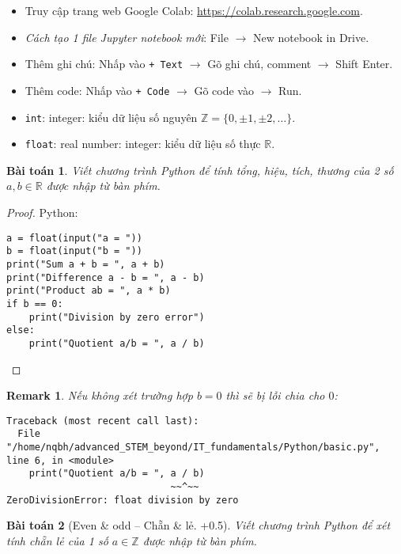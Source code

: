 \documentclass{article}
\newtheorem{baitoan}{Bài toán}
\newtheorem{remark}{Remark}
\begin{document}
\begin{itemize}
	\item Truy cập trang web Google Colab: \url{https://colab.research.google.com}.
	\item {\it Cách tạo 1 file Jupyter notebook mới}: File $\to$ New notebook in Drive.
	\item Thêm ghi chú: Nhấp vào {\tt+ Text} $\to$ Gõ ghi chú, comment $\to$ Shift Enter.
	\item Thêm code: Nhấp vào {\tt+ Code} $\to$ Gõ code vào $\to$ Run.
\end{itemize}

\begin{itemize}
	\item {\tt int}: integer: kiểu dữ liệu số nguyên $\mathbb{Z} = \{0,\pm1,\pm2,\ldots\}$.
	\item {\tt float}: real number: integer: kiểu dữ liệu số thực $\mathbb{R}$.
\end{itemize}

\begin{baitoan}
	Viết chương trình Python để tính tổng, hiệu, tích, thương của 2 số $a,b\in\mathbb{R}$ được nhập từ bàn phím.
\end{baitoan}

\begin{proof}
	Python:
	\begin{verbatim}
a = float(input("a = "))
b = float(input("b = "))
print("Sum a + b = ", a + b)
print("Difference a - b = ", a - b)
print("Product ab = ", a * b)
if b == 0:
    print("Division by zero error")
else:
    print("Quotient a/b = ", a / b)
	\end{verbatim}
\end{proof}

\begin{remark}
	Nếu không xét trường hợp $b = 0$ thì sẽ bị lỗi chia cho $0$:
	\begin{verbatim}
Traceback (most recent call last):
  File "/home/nqbh/advanced_STEM_beyond/IT_fundamentals/Python/basic.py", line 6, in <module>
    print("Quotient a/b = ", a / b)
                             ~~^~~
ZeroDivisionError: float division by zero
	\end{verbatim}
\end{remark}

\begin{baitoan}[Even \& odd -- Chẵn \& lẻ. +0.5]
	Viết chương trình Python để xét tính chẵn lẻ của 1 số $a\in\mathbb{Z}$ được nhập từ bàn phím.
\end{baitoan}
\end{document}
